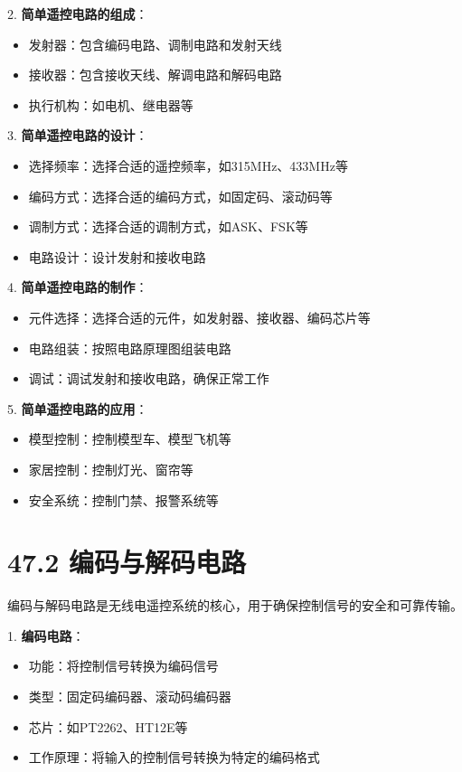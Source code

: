 \documentclass[12pt,UTF8]{ctexbook}
\begin{document}
2. \textbf{简单遥控电路的组成}：
   \begin{itemize}[leftmargin=3.5em]
   \item 发射器：包含编码电路、调制电路和发射天线
   \item 接收器：包含接收天线、解调电路和解码电路
   \item 执行机构：如电机、继电器等
   \end{itemize}

3. \textbf{简单遥控电路的设计}：
   \begin{itemize}[leftmargin=3.5em]
   \item 选择频率：选择合适的遥控频率，如315MHz、433MHz等
   \item 编码方式：选择合适的编码方式，如固定码、滚动码等
   \item 调制方式：选择合适的调制方式，如ASK、FSK等
   \item 电路设计：设计发射和接收电路
   \end{itemize}

4. \textbf{简单遥控电路的制作}：
   \begin{itemize}[leftmargin=3.5em]
   \item 元件选择：选择合适的元件，如发射器、接收器、编码芯片等
   \item 电路组装：按照电路原理图组装电路
   \item 调试：调试发射和接收电路，确保正常工作
   \end{itemize}

5. \textbf{简单遥控电路的应用}：
   \begin{itemize}[leftmargin=3.5em]
   \item 模型控制：控制模型车、模型飞机等
   \item 家居控制：控制灯光、窗帘等
   \item 安全系统：控制门禁、报警系统等
   \end{itemize}

\section*{47.2 编码与解码电路}

编码与解码电路是无线电遥控系统的核心，用于确保控制信号的安全和可靠传输。

1. \textbf{编码电路}：
   \begin{itemize}[leftmargin=3.5em]
   \item 功能：将控制信号转换为编码信号
   \item 类型：固定码编码器、滚动码编码器
   \item 芯片：如PT2262、HT12E等
   \item 工作原理：将输入的控制信号转换为特定的编码格式
   \end{itemize}
\end{document}
